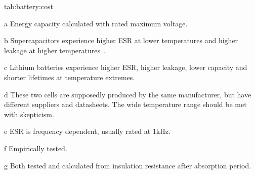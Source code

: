 \begin{definetable*}{tab:battery:cost}
\begin{adjustbox}{width=1\textwidth}
\begin{threeparttable}
\begin{tabular}
   \end{tabular}
    \begin{tablenotes}[para]
        \item[a] Energy capacity calculated with rated maximum voltage.
        \item[b] Supercapacitors experience higher ESR at lower temperatures and higher leakage at higher temperatures~\cite{murataTech}.\\
        \item[c] Lithium batteries experience higher ESR, higher leakage, lower capacity and shorter lifetimes at temperature extremes.\\
        \item[d] These two cells are supposedly produced by the same manufacturer, but have different suppliers and datasheets. The wide temperature range should be met with skepticism.\\
        \item[e] ESR is frequency dependent, usually rated at 1\si{\kilo\hertz}.
        \item[f] Empirically tested.\\
        \item[g] Both tested and calculated from insulation resistance after absorption period.\\

\end{tablenotes}
\end{threeparttable}
\end{adjustbox}
\end{definetable*}

